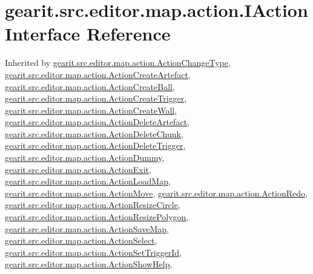 \hypertarget{interfacegearit_1_1src_1_1editor_1_1map_1_1action_1_1_i_action}{\section{gearit.\+src.\+editor.\+map.\+action.\+I\+Action Interface Reference}
\label{interfacegearit_1_1src_1_1editor_1_1map_1_1action_1_1_i_action}
}


Inherited by \hyperlink{classgearit_1_1src_1_1editor_1_1map_1_1action_1_1_action_change_type}{gearit.\+src.\+editor.\+map.\+action.\+Action\+Change\+Type}, \hyperlink{classgearit_1_1src_1_1editor_1_1map_1_1action_1_1_action_create_artefact}{gearit.\+src.\+editor.\+map.\+action.\+Action\+Create\+Artefact}, \hyperlink{classgearit_1_1src_1_1editor_1_1map_1_1action_1_1_action_create_ball}{gearit.\+src.\+editor.\+map.\+action.\+Action\+Create\+Ball}, \hyperlink{classgearit_1_1src_1_1editor_1_1map_1_1action_1_1_action_create_trigger}{gearit.\+src.\+editor.\+map.\+action.\+Action\+Create\+Trigger}, \hyperlink{classgearit_1_1src_1_1editor_1_1map_1_1action_1_1_action_create_wall}{gearit.\+src.\+editor.\+map.\+action.\+Action\+Create\+Wall}, \hyperlink{classgearit_1_1src_1_1editor_1_1map_1_1action_1_1_action_delete_artefact}{gearit.\+src.\+editor.\+map.\+action.\+Action\+Delete\+Artefact}, \hyperlink{classgearit_1_1src_1_1editor_1_1map_1_1action_1_1_action_delete_chunk}{gearit.\+src.\+editor.\+map.\+action.\+Action\+Delete\+Chunk}, \hyperlink{classgearit_1_1src_1_1editor_1_1map_1_1action_1_1_action_delete_trigger}{gearit.\+src.\+editor.\+map.\+action.\+Action\+Delete\+Trigger}, \hyperlink{classgearit_1_1src_1_1editor_1_1map_1_1action_1_1_action_dummy}{gearit.\+src.\+editor.\+map.\+action.\+Action\+Dummy}, \hyperlink{classgearit_1_1src_1_1editor_1_1map_1_1action_1_1_action_exit}{gearit.\+src.\+editor.\+map.\+action.\+Action\+Exit}, \hyperlink{classgearit_1_1src_1_1editor_1_1map_1_1action_1_1_action_load_map}{gearit.\+src.\+editor.\+map.\+action.\+Action\+Load\+Map}, \hyperlink{classgearit_1_1src_1_1editor_1_1map_1_1action_1_1_action_move}{gearit.\+src.\+editor.\+map.\+action.\+Action\+Move}, \hyperlink{classgearit_1_1src_1_1editor_1_1map_1_1action_1_1_action_redo}{gearit.\+src.\+editor.\+map.\+action.\+Action\+Redo}, \hyperlink{classgearit_1_1src_1_1editor_1_1map_1_1action_1_1_action_resize_circle}{gearit.\+src.\+editor.\+map.\+action.\+Action\+Resize\+Circle}, \hyperlink{classgearit_1_1src_1_1editor_1_1map_1_1action_1_1_action_resize_polygon}{gearit.\+src.\+editor.\+map.\+action.\+Action\+Resize\+Polygon}, \hyperlink{classgearit_1_1src_1_1editor_1_1map_1_1action_1_1_action_save_map}{gearit.\+src.\+editor.\+map.\+action.\+Action\+Save\+Map}, \hyperlink{classgearit_1_1src_1_1editor_1_1map_1_1action_1_1_action_select}{gearit.\+src.\+editor.\+map.\+action.\+Action\+Select}, \hyperlink{classgearit_1_1src_1_1editor_1_1map_1_1action_1_1_action_set_trigger_id}{gearit.\+src.\+editor.\+map.\+action.\+Action\+Set\+Trigger\+Id}, \hyperlink{classgearit_1_1src_1_1editor_1_1map_1_1action_1_1_action_show_help}{gearit.\+src.\+editor.\+map.\+action.\+Action\+Show\+Help}, 